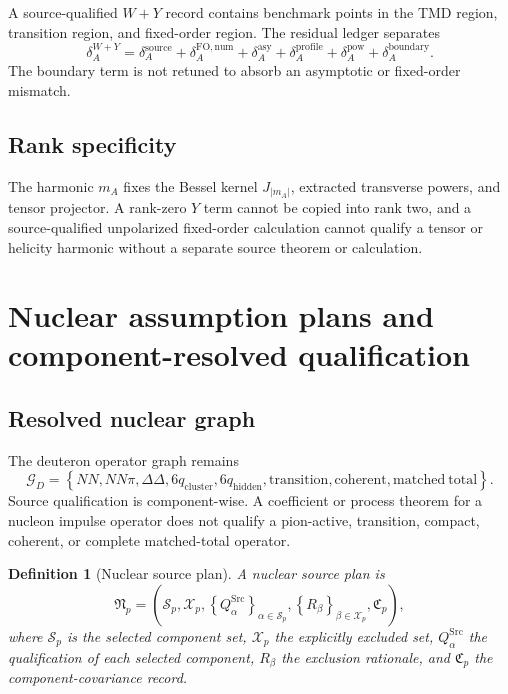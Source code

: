 \documentclass[11pt]{article}
\newtheorem{definition}{Definition}[section]
\newcommand{\Src}{\ensuremath{\mathrm{Src}}}
\newcommand{\WY}{W\!+\!Y}
\begin{document}
A source-qualified \(W+Y\) record contains benchmark points in the TMD region, transition region, and fixed-order region.  The residual ledger separates
\begin{equation}
 \delta_A^{\WY}
 =
 \delta_A^{\mathrm{source}}
 +\delta_A^{\mathrm{FO,num}}
 +\delta_A^{\mathrm{asy}}
 +\delta_A^{\mathrm{profile}}
 +\delta_A^{\mathrm{pow}}
 +\delta_A^{\mathrm{boundary}}.
 \label{eq:wy-ledger}
\end{equation}
The boundary term is not retuned to absorb an asymptotic or fixed-order mismatch.

\subsection{Rank specificity}

The harmonic \(m_A\) fixes the Bessel kernel \(J_{|m_A|}\), extracted transverse powers, and tensor projector.  A rank-zero \(Y\) term cannot be copied into rank two, and a source-qualified unpolarized fixed-order calculation cannot qualify a tensor or helicity harmonic without a separate source theorem or calculation.

\section{Nuclear assumption plans and component-resolved qualification}
\label{sec:nuclear}

\subsection{Resolved nuclear graph}

The deuteron operator graph remains
\begin{equation}
 \mathcal G_D
 =
 \left\{
 NN,
 NN\pi,
 \Delta\Delta,
 6q_{\mathrm{cluster}},
 6q_{\mathrm{hidden}},
 \mathrm{transition},
 \mathrm{coherent},
 \mathrm{matched\ total}
 \right\}.
 \label{eq:nuclear-graph}
\end{equation}
Source qualification is component-wise.  A coefficient or process theorem for a nucleon impulse operator does not qualify a pion-active, transition, compact, coherent, or complete matched-total operator.

\begin{definition}[Nuclear source plan]
A nuclear source plan is
\begin{equation}
 \mathfrak N_p
 =
 \left(
 \mathcal S_p,
 \mathcal X_p,
 \left\{Q_\alpha^{\Src}\right\}_{\alpha\in\mathcal S_p},
 \left\{R_\beta\right\}_{\beta\in\mathcal X_p},
 \mathfrak C_p
 \right),
 \label{eq:nuclear-source-plan}
\end{equation}
where \(\mathcal S_p\) is the selected component set, \(\mathcal X_p\) the explicitly excluded set, \(Q_\alpha^{\Src}\) the qualification of each selected component, \(R_\beta\) the exclusion rationale, and \(\mathfrak C_p\) the component-covariance record.
\end{definition}
\end{document}
